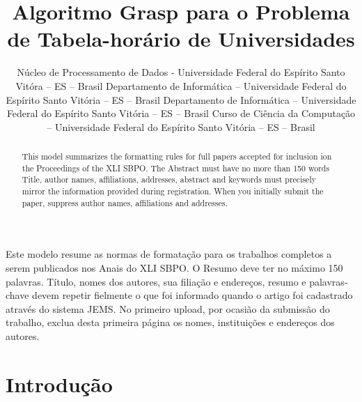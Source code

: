 \documentclass[11pt]{article}
\title{Algoritmo Grasp para o Problema de Tabela-horário de Universidades}
\author{\sbpoauthor{Walace S. Rocha}
                   {Núcleo de Processamento de Dados - Universidade Federal do Espírito Santo}
                   {Vitóra -- ES -- Brasil}
                   {\email{walacesrocha@yahoo.com.br}}
        \sbpoauthor{Maria C. S. Boeres}
                   {Departamento de Informática -- Universidade Federal do Espírito Santo}
                   {Vitória -- ES -- Brasil}
                   {\email{boeres@inf.ufes.br}}
        \sbpoauthor{Maria C. Rangel}
                   {Departamento de Informática -- Universidade Federal do Espírito Santo}
                   {Vitória -- ES -- Brasil}
                   {\email{crangel@inf.ufes.br}}
        \sbpoauthor{Leandro B. Ferreira}
                   {Curso de Ciência da Computação -- Universidade Federal do Espírito Santo}
                   {Vitória -- ES -- Brasil}
                   {\email{leandrobfe@gmail.com}}}
\begin{document}
 

\maketitle


\begin{resumo} 
  Este modelo resume as normas de formatação para os trabalhos completos a serem publicados nos Anais do XLI SBPO. O Resumo deve ter no máximo 150 palavras. Título, nomes dos autores, sua filiação e endereços, resumo e palavras-chave devem repetir fielmente o que foi informado quando o artigo foi cadastrado através do sistema JEMS. No primeiro upload, por ocasião da submissão do trabalho, exclua desta primeira página os nomes, instituições e endereços dos autores.
\end{resumo}


\begin{abstract}
  This model summarizes the formatting rules for full papers accepted for inclusion ion the Proceedings of the XLI SBPO. The Abstract must have no more than 150 words Title, author names, affiliations, addresses, abstract and keywords must precisely mirror the information provided during registration. When you initially submit the paper, suppress author names, affiliations and addresses.
\end{abstract}

\newpage
 
\section{Introdução}
\end{document}
